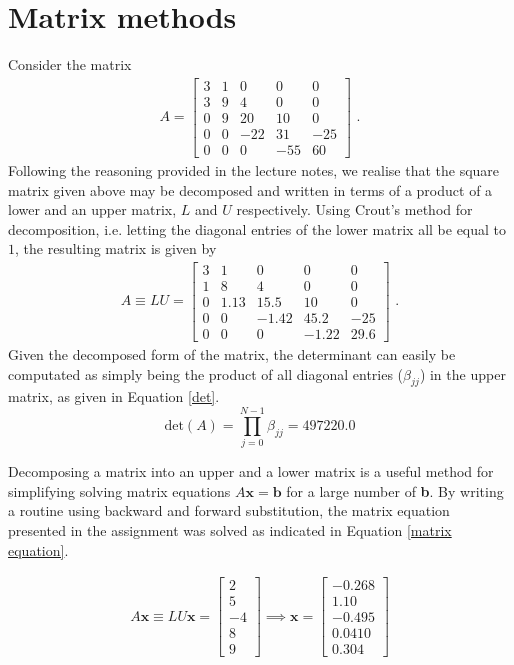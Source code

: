 \documentclass[paper=a4, fontsize=11pt]{scrartcl}
\begin{document}
\section{Matrix methods}
Consider the matrix
\begin{align}
\label{A define}
	A = 
	\begin{bmatrix}
	3 & 1 & 0 & 0 & 0 \\
  	3 & 9 & 4 & 0 & 0 \\
  	0 & 9 & 20 & 10 & 0 \\
  	0 & 0 & -22 & 31 & -25 \\
  	0 & 0 & 0 & -55 & 60
	\end{bmatrix}  \text{ .}
\end{align}
Following the reasoning provided in the lecture notes, we realise that the square matrix given above may be decomposed and written in terms of a product of a lower and an upper matrix, $L$ and $U$ respectively. Using Crout's method for decomposition, i.e. letting the diagonal entries of the lower matrix all be equal to $1$, the resulting matrix is given by
\begin{align}	
	A \equiv LU =
		\begin{bmatrix}
	3 & 1 & 0 & 0 & 0 \\
	1 & 8 & 4 & 0 & 0 \\
	0 & 1.13 & 15.5 & 10 & 0 \\
	0 & 0 & -1.42 & 45.2 & -25 \\
	0 & 0 & 0 & -1.22 & 29.6
	\end{bmatrix}  \text{ .}
\end{align}
Given the decomposed form of the matrix, the determinant can easily be computated as simply being the product of all diagonal entries ($\beta_{jj}$) in the upper matrix, as given in Equation \ref{det}. 
\begin{equation}
\label{det}
\text{det}(A) = \prod_{j=0}^{N-1} \beta_{jj} = 497220.0
\end{equation}

Decomposing a matrix into an upper and a lower matrix is a useful method for simplifying solving matrix equations $A \textbf{x} = \textbf{b}$ for a large number of \textbf{b}. By writing a routine using backward and forward substitution, the matrix equation presented in the assignment was solved as indicated in Equation \ref{matrix equation}. 

\begin{align}
\label{matrix equation}
A \textbf{x} \equiv LU \textbf{x} = 
	\begin{bmatrix}
	2 \\
	5 \\
	-4 \\
	8 \\
	9
	\end{bmatrix}
	\implies \textbf{x} =
	\begin{bmatrix}
	-0.268 \\
	1.10 \\
	-0.495 \\
	0.0410 \\
	0.304
	\end{bmatrix}
\end{align}
\end{document}

